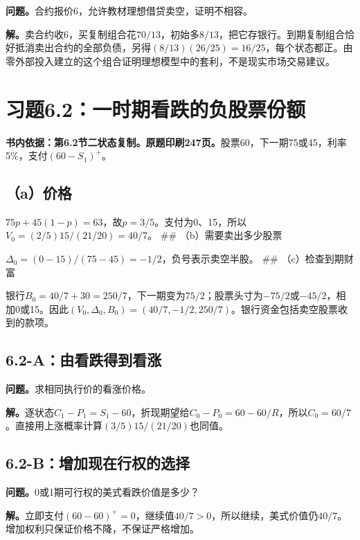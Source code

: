 \documentclass[11pt,a4paper,UTF8,fontset=fandol]{ctexart}
\begin{document}
\textbf{问题。}合约报价6，允许教材理想借贷卖空，证明不相容。

\textbf{解。}卖合约收6，买复制组合花\(70/13\)，初始多\(8/13\)，把它存银行。到期复制组合恰好抵消卖出合约的全部负债，另得\((8/13)(26/25)=\boxed{16/25}\)，每个状态都正。由零外部投入建立的这个组合证明理想模型中的套利，不是现实市场交易建议。

\bigskip

\section{习题6.2：一时期看跌的负股票份额}\label{ux4e60ux98986.2ux4e00ux65f6ux671fux770bux8dccux7684ux8d1fux80a1ux7968ux4efdux989d}

\textbf{书内依据：第6.2节二状态复制。原题印刷247页。}股票60，下一期75或45，利率5\%，支付\((60-S_1)^+\)。

\subsection{（a）价格}\label{aux4ef7ux683c}

\(75p+45(1-p)=63\)，故\(p=3/5\)。支付为0、15，所以\(\boxed{V_0=(2/5)15/(21/20)=40/7}\)。
\#\# （b）需要卖出多少股票

\(\boxed{\Delta_0=(0-15)/(75-45)=-1/2}\)，负号表示卖空半股。 \#\#
（c）检查到期财富

银行\(B_0=40/7+30=250/7\)，下一期变为\(75/2\)；股票头寸为\(-75/2\)或\(-45/2\)，相加0或15。因此\(\boxed{(V_0,\Delta_0,B_0)=(40/7,-1/2,250/7)}\)。银行资金包括卖空股票收到的款项。

\subsection{6.2-A：由看跌得到看涨}\label{aux7531ux770bux8dccux5f97ux5230ux770bux6da8}

\textbf{问题。}求相同执行价的看涨价格。

\textbf{解。}逐状态\(C_1-P_1=S_1-60\)，折现期望给\(C_0-P_0=60-60/R\)，所以\(\boxed{C_0=60/7}\)。直接用上涨概率计算\((3/5)15/(21/20)\)也同值。

\subsection{6.2-B：增加现在行权的选择}\label{bux589eux52a0ux73b0ux5728ux884cux6743ux7684ux9009ux62e9}

\textbf{问题。}0或1期可行权的美式看跌价值是多少？

\textbf{解。}立即支付\((60-60)^+=0\)，继续值\(40/7>0\)，所以继续，美式价值仍\(\boxed{40/7}\)。增加权利只保证价格不降，不保证严格增加。
\end{document}
